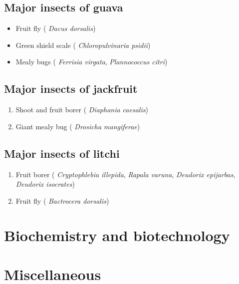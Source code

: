 \documentclass[
]{book}
\providecommand{\tightlist}{%
  \setlength{\itemsep}{0pt}\setlength{\parskip}{0pt}}
\begin{document}
\hypertarget{major-insects-of-guava}{%
\section{Major insects of guava}\label{major-insects-of-guava}}

\begin{itemize}
\tightlist
\item
  Fruit fly ( \emph{Dacus dorsalis})
\item
  Green shield scale ( \emph{Chloropulvinaria psidii})
\item
  Mealy bugs ( \emph{Ferrisia virgata}, \emph{Plannococcus citri})
\end{itemize}

\hypertarget{major-insects-of-jackfruit}{%
\section{Major insects of jackfruit}\label{major-insects-of-jackfruit}}

\begin{enumerate}
\def\labelenumi{\arabic{enumi}.}
\tightlist
\item
  Shoot and fruit borer ( \emph{Diaphania caesalis})
\item
  Giant mealy bug ( \emph{Drosicha mangiferae})
\end{enumerate}

\hypertarget{major-insects-of-litchi}{%
\section{Major insects of litchi}\label{major-insects-of-litchi}}

\begin{enumerate}
\def\labelenumi{\arabic{enumi}.}
\tightlist
\item
  Fruit borer ( \emph{Cryptophlebia illepida}, \emph{Rapala varuna}, \emph{Deudorix epijarbas}, \emph{Deudorix isocrates})
\item
  Fruit fly ( \emph{Bactrocera dorsalis})
\end{enumerate}

\hypertarget{biochemistry-and-biotechnology}{%
\chapter{Biochemistry and biotechnology}\label{biochemistry-and-biotechnology}}

\hypertarget{miscellaneous}{%
\chapter{Miscellaneous}\label{miscellaneous}}
\end{document}
